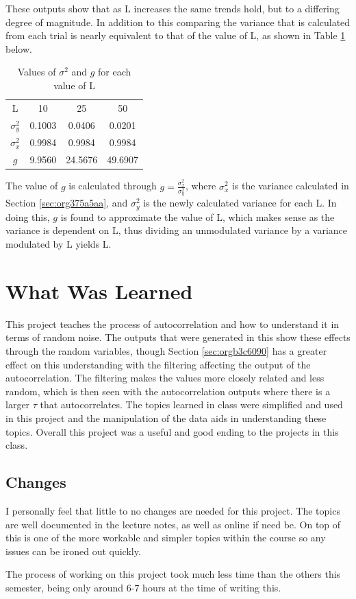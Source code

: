\documentclass[a4paper, 11pt]{article}
\begin{document}
\medskip
These outputs show that as L increases the same trends hold, but to a differing degree of magnitude. In addition to this comparing the variance that is calculated from each trial is nearly equivalent to that of the value of L, as shown in Table \ref{tab:sigma} below.

\begin{table}[htbp]
\caption{\label{tab:sigma}Values of \(\sigma^2\) and \(g\) for each value of L}
\centering
\begin{tabular}{|c|c|c|c|}
\hline
L & 10 & 25 & 50\\
\(\sigma^2_y\) & 0.1003 & 0.0406 & 0.0201\\
\hline
\(\sigma^2_x\) & 0.9984 & 0.9984 & 0.9984\\
\hline
\(g\) & 9.9560 & 24.5676 & 49.6907\\
\hline
\end{tabular}
\end{table}

The value of \(g\) is calculated through \(g = \displaystyle\frac{\sigma^2_x}{\sigma^2_y}\), where \(\sigma^2_x\) is the variance calculated in Section \ref{sec:org375a5aa}, and \(\sigma^2_y\) is the newly calculated variance for each L. In doing this, \(g\) is found to approximate the value of L, which makes sense as the variance is dependent on L, thus dividing an unmodulated variance by a variance modulated by L yields L.

\section{What Was Learned}
\label{sec:org265fa1c}
This project teaches the process of autocorrelation and how to understand it in terms of random noise. The outputs that were generated in this show these effects through the random variables, though Section \ref{sec:orgb3c6090} has a greater effect on this understanding with the filtering affecting the output of the autocorrelation. The filtering makes the values more closely related and less random, which is then seen with the autocorrelation outputs where there is a larger \(\tau\) that autocorrelates. The topics learned in class were simplified and used in this project and the manipulation of the data aids in understanding these topics. Overall this project was a useful and good ending to the projects in this class.
\subsection{Changes}
\label{sec:org94474a1}
I personally feel that little to no changes are needed for this project. The topics are well documented in the lecture notes, as well as online if need be. On top of this is one of the more workable and simpler topics within the course so any issues can be ironed out quickly.

The process of working on this project took much less time than the others this semester, being only around 6-7 hours at the time of writing this.
\end{document}
